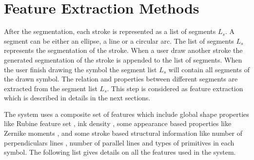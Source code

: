 %
%

\section{Feature Extraction Methods}%
\label{sec:FeatureExtraction}

After the segmentation, each stroke is represented as a list of segments $L_s$. A segment can be either an ellipse, a line or a circular arc. The list of segments $L_s$ represents the segmentation of the stroke. When a user draw another stroke the generated segmentation of the stroke is appended to the list of segments.  When the user finish drawing the symbol the segment list $L_s$ will contain all segments of the drawn symbol. The relation and properties between different segments are extracted from the segment list $L_s$.  This step is considered as feature extraction which is described in details in the next sections. 

The system uses a composite set of features which include global shape properties like Rubine feature set \cite{gestureexample12},  ink density \cite{GeometryAndDomain102}, some appearance based properties like Zernike moments \cite{HeloiseBeautification}, and some stroke based structural information like number of perpendiculars lines , number of parallel lines and types of primitives in each symbol. The following list gives details on all the features used in the system.


